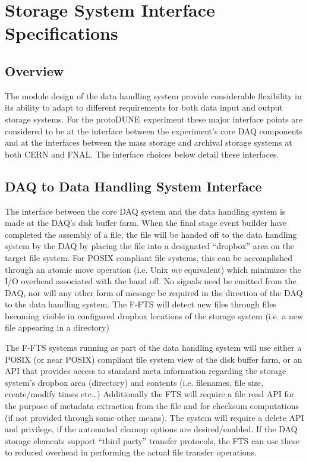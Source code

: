 \documentclass[pdftex,12pt,letter]{article}
\newcommand{\pd}{protoDUNE\ }
\begin{document}
\section{Storage System Interface Specifications}
\subsection{Overview}
The module design of the data handling system provide considerable flexibility in its ability to adapt to different requirements
for both data input and output storage systems.  For the \pd experiment these major interface points are considered
to be at the interface between the experiment’s core DAQ components and at the interfaces between the mass storage and
archival storage systems at both CERN and FNAL.  The interface choices below detail these interfaces.

\subsection{DAQ to Data Handling System Interface}
The interface between the core DAQ system and the data handling system is made at the DAQ’s disk buffer farm.
When the final stage event builder have completed the assembly of a file, the file will be handed off to the data handling system
by the DAQ by placing the file into a designated ``dropbox'' area on the target file system.  For POSIX compliant file systems,
this can be accomplished through an atomic move operation (i.e. Unix \textit{mv} equivalent) which minimizes the I/O overhead associated
with the hand off.  No signals need be emitted from the DAQ, nor will any other form of message be required in the direction of the
DAQ to the data handling system.  The F-FTS will detect new files through files becoming visible in configured dropbox locations of
the storage system (i.e. a new file appearing in a directory) 

The F-FTS systems running as part of the data handling system will use either a POSIX (or near POSIX) compliant file system view of the disk buffer farm,
or an API that provides access to standard meta information regarding the storage system’s dropbox area (directory) and contents (i.e. filenames, file size, create/modify times etc…)  Additionally the FTS will require a file read API for the purpose of metadata extraction from the file and for checksum computations (if not provided through some other means).  The system will require a delete API and privilege, if the automated cleanup options are desired/enabled.  If the DAQ storage elements support “third party” transfer protocols, the FTS can use these to reduced overhead in performing the actual file transfer operations.
\end{document}
